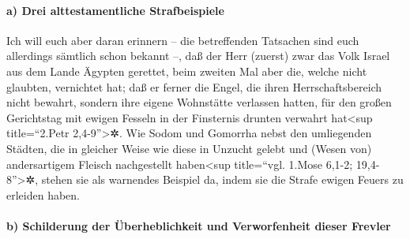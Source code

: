 \hypertarget{a-drei-alttestamentliche-strafbeispiele}{%
\paragraph{a) Drei alttestamentliche
Strafbeispiele}\label{a-drei-alttestamentliche-strafbeispiele}}

 Ich will euch aber daran erinnern -- die betreffenden
Tatsachen sind euch allerdings sämtlich schon bekannt --, daß der Herr
(zuerst) zwar das Volk Israel aus dem Lande Ägypten gerettet, beim
zweiten Mal aber die, welche nicht glaubten, vernichtet hat;
 daß er ferner die Engel, die ihren Herrschaftsbereich
nicht bewahrt, sondern ihre eigene Wohnstätte verlassen hatten, für den
großen Gerichtstag mit ewigen Fesseln in der Finsternis drunten verwahrt
hat\textless sup title=``2.Petr 2,4-9''\textgreater✲.  Wie
Sodom und Gomorrha nebst den umliegenden Städten, die in gleicher Weise
wie diese in Unzucht gelebt und (Wesen von) andersartigem Fleisch
nachgestellt haben\textless sup title=``vgl. 1.Mose 6,1-2;
19,4-8''\textgreater✲, stehen sie als warnendes Beispiel da, indem sie
die Strafe ewigen Feuers zu erleiden haben.

\hypertarget{b-schilderung-der-uxfcberheblichkeit-und-verworfenheit-dieser-frevler}{%
\paragraph{b) Schilderung der Überheblichkeit und Verworfenheit dieser
Frevler}\label{b-schilderung-der-uxfcberheblichkeit-und-verworfenheit-dieser-frevler}}

